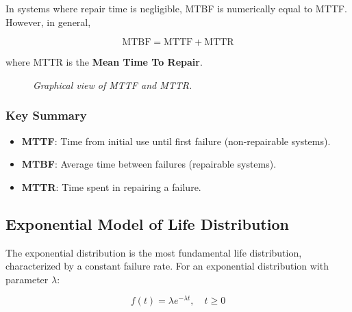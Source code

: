 \documentclass[twoside]{book}
\begin{document}
In systems where repair time is negligible, MTBF is numerically equal to MTTF. However, in general,

\begin{textbox}
\[
\text{MTBF} = \text{MTTF} + \text{MTTR}
\]
\end{textbox}

where MTTR is the \textbf{Mean Time To Repair}.

\vspace{2mm}

\begin{figure}[H]
\begin{center}
\end{center}
\caption{\textit{Graphical view of MTTF and MTTR.}}
\end{figure}


\subsubsection{Key Summary}
\begin{itemize}
\item \textbf{MTTF}: Time from initial use until first failure (non-repairable systems).
\item \textbf{MTBF}: Average time between failures (repairable systems).
\item \textbf{MTTR}: Time spent in repairing a failure.
\end{itemize}

\subsection{Exponential Model of Life Distribution}

The exponential distribution is the most fundamental life distribution, characterized by a constant failure rate. For an exponential distribution with parameter $\lambda$:
\begin{textbox}
\[
f(t) = \lambda e^{-\lambda t}, \quad t \geq 0
\]
\end{textbox}
\end{document}
